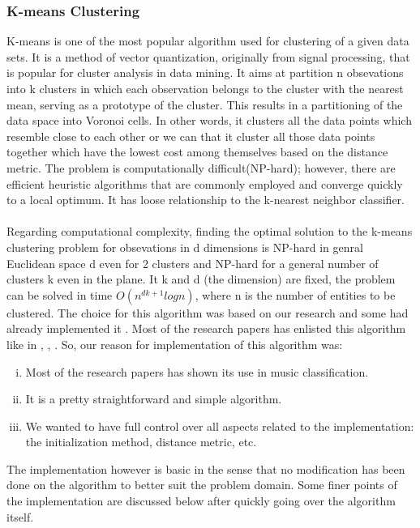 \subsubsection{K-means Clustering}

K-means is one of the most popular algorithm used for clustering of a given data sets. It is a method of vector quantization, originally
from signal processing, that is popular for cluster analysis in data mining. It aims at partition n obsevations into k clusters in which each observation
belongs to the cluster with the nearest mean, serving as a prototype of the cluster. This results in a partitioning of the data space into Voronoi cells. 
In other words, it clusters all the data points which resemble close
to each other or we can that it cluster all those data points together which have the lowest cost among themselves based on the distance metric.
The problem is computationally difficult(NP-hard); however, there are efficient heuristic algorithms that are commonly employed and converge quickly to a local optimum.
It has loose relationship to the k-nearest neighbor classifier.\\ 
\\
Regarding computational complexity, finding the optimal solution to the k-means clustering problem for obsevations in d dimensions is NP-hard in genral Euclidean space
d even for 2 clusters and NP-hard for a general number of clusters k even in the plane. It k and d (the dimension) are fixed, the problem can be solved in time
$O(n^{dk+1}logn)$, where n is the number of entities to be clustered.
The choice for this algorithm was based on our research and some had already implemented it \cite{Haggblade2011}. Most of the research papers has enlisted this algorithm like in \cite{muller2011}, 
\cite{Hamerly2002}, \cite{Haggblade2011}. So, our reason for implementation of this algorithm was:
\begin{enumerate}[(i)]
        \item Most of the research papers has shown its use in music classification.
        \item It is a pretty straightforward and simple algorithm.
        \item We wanted to have full control over all aspects related to the implementation: the initialization method, distance metric, etc.
\end{enumerate}
The implementation however is basic in the sense that no modification has been done on the algorithm to better suit the problem domain. 
Some finer points of the implementation are discussed below after quickly going over the algorithm itself.\\ 
